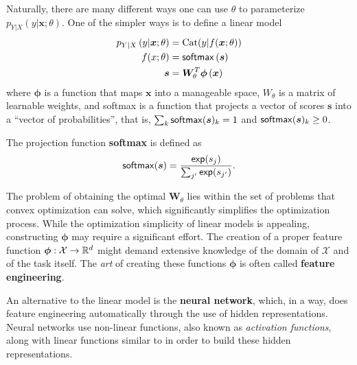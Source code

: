 \noindent Naturally, there are many different ways one can use $\theta$ to
parameterize $p_{Y|X}\left(y|\bm{x};\theta\right)$. One of the simpler ways
is to define a linear model
%
\begin{align}
    p_{Y|X}\left(y|\bm{x};\theta\right) & = \text{Cat}(y|f(\bm x; \theta)) \\
    f(x; \theta)                        & = \operatorname*{\mathsf{softmax}} \left(\bm{s}\right)   \\
    \bm{s}                              & 
    = \bm{W}_{\theta}^T\bm{\phi}\left(\bm{x}\right) \label{eq:linear}
\end{align}
%
where $\bm{\phi}$ is a function that maps $\bm{x}$ into a
manageable space, $W_{\theta}$ is a matrix of learnable weights, and
softmax is a function that projects a vector of scores $\bm{s}$ into
a ``vector of probabilities'', that is, $\sum_k\operatorname*{\mathsf{softmax}}(\bm{s})_k=1$
and $\operatorname*{\mathsf{softmax}}(\bm{s})_k \geq 0$.

\begin{definition}[softmax]
    The projection function \textbf{softmax} is defined as
    \begin{equation}\label{eq:softmax}
        \operatorname*{\mathsf{softmax}}(\bm{s}) = \frac{\operatorname*{\mathsf{exp}}(s_j)}{\sum_{j'} \operatorname*{\mathsf{exp}}(s_{j'})}.
    \end{equation}
\end{definition}

The problem of obtaining the optimal $\bm{W}_{\theta}$ lies
within the set of problems that convex optimization can solve, which
significantly simplifies the optimization process. While the
optimization simplicity of linear models is appealing, constructing
$\bm{\phi}$ may require a significant effort. The creation of a
proper feature function $\bm{\phi}: \mathcal{X} \rightarrow \mathbb{R}^d$ might
demand extensive knowledge of the domain of $\mathcal{X}$ and of the
task itself. The \textit{art} of creating these functions $\bm{\phi}$
is often called \textbf{feature engineering}.

An alternative to the linear model is the \textbf{neural network}, which, in a
way, does feature engineering automatically through the use of hidden
representations. Neural networks use non-linear functions, also known
as \textit{activation functions}, along with linear functions similar
to  in order to build these hidden representations.

